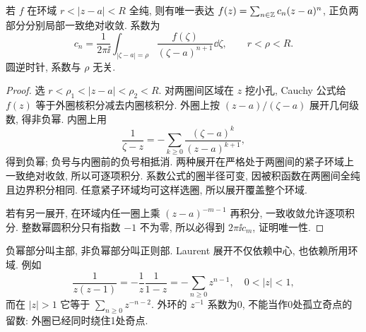 \begin{theorem}[Laurent]\label{thm:laurent}
若 $f$ 在环域 $r<|z-a|<R$ 全纯, 则有唯一表达 $f(z)=\sum_{n\in\mathbb Z}c_n(z-a)^n$, 正负两部分分别局部一致绝对收敛. 系数为
\[
c_n=\frac1{2\pi\ii}\int_{|\zeta-a|=\rho}\frac{f(\zeta)}{(\zeta-a)^{n+1}}\dd\zeta,\qquad r<\rho<R.
\]
圆逆时针, 系数与 $\rho$ 无关.
\end{theorem}
\begin{proof}
选 $r<\rho_1<|z-a|<\rho_2<R$. 对两圈间区域在 $z$ 挖小孔, Cauchy 公式给 $f(z)$ 等于外圈核积分减去内圈核积分. 外圈上按 $(z-a)/(\zeta-a)$ 展开几何级数, 得非负幂. 内圈上用
\[
\frac1{\zeta-z}=-\sum_{k\ge0}\frac{(\zeta-a)^k}{(z-a)^{k+1}},
\]
得到负幂; 负号与内圈前的负号相抵消. 两种展开在严格处于两圈间的紧子环域上一致绝对收敛, 所以可逐项积分. 系数公式的圈半径可变, 因被积函数在两圈间全纯且边界积分相同. 任意紧子环域均可这样选圈, 所以展开覆盖整个环域.

若有另一展开, 在环域内任一圈上乘 $(z-a)^{-m-1}$ 再积分, 一致收敛允许逐项积分. 整数幂圆积分只有指数 $-1$ 不为零, 所以必得到 $2\pi\ii c_m$, 证明唯一性.
\end{proof}
负幂部分叫主部, 非负幂部分叫正则部. Laurent 展开不仅依赖中心, 也依赖所用环域. 例如
\[
\frac1{z(z-1)}=-\frac1z\frac1{1-z}=-\sum_{n\ge0}z^{n-1},\quad 0<|z|<1,
\]
而在 $|z|>1$ 它等于 $\sum_{n\ge0}z^{-n-2}$. 外环的 $z^{-1}$ 系数为0, 不能当作0处孤立奇点的留数: 外圈已经同时绕住1处奇点.

